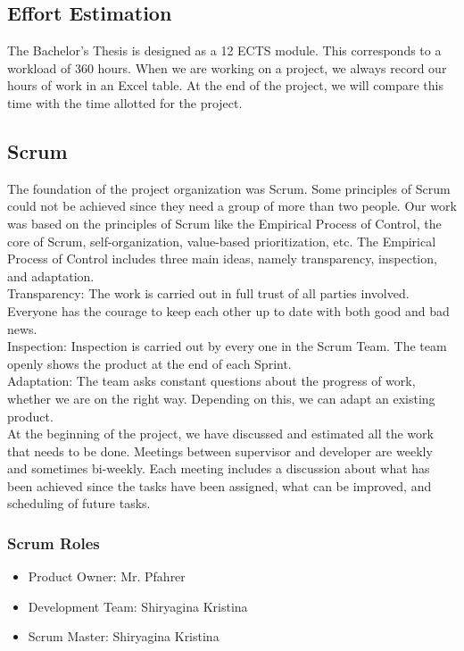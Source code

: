 \documentclass{scrartcl}
\begin{document}
\subsection{Effort Estimation}
  		
The Bachelor's Thesis  is designed as a 12 ECTS module. This corresponds to a workload of 360 hours. When we are working on a project, we always record our hours of work in an Excel table.
 At the end of the project, we will compare this time with the time allotted for the project. 		
  		
  		
  		
  		
  		
\subsection{Scrum}  	
The foundation of the project organization was Scrum.
 	    Some principles of Scrum could not be achieved since they need a group of more than two people. 
 	    Our work was based on the principles of Scrum like the Empirical Process of Control, the core of Scrum, self-organization, value-based prioritization, etc.
 	    The Empirical Process of Control includes three main ideas, namely transparency, inspection, and adaptation. \\
 	    Transparency: The work is carried out in full trust of all parties involved. Everyone has the courage to keep each other up to date with both good and bad news. \\ 
 	    Inspection: Inspection is carried out by every one in the Scrum Team. The team openly shows the product at the end of each Sprint.			 \\
 	    Adaptation: The team asks constant questions about the progress of work, whether we are on the right way. Depending on this, we can adapt an existing product.		 \\
 	    
 	    At the beginning of the project, we have discussed and estimated all the work that needs to be done. 
 	    Meetings between supervisor and developer are weekly and sometimes bi-weekly.
 	    Each meeting includes a discussion about what has been achieved 
 	    since the tasks have been assigned, what can be improved, and scheduling of future tasks.
 	    
 	    
 	    
 	    
 	    
 \subsubsection{Scrum Roles}
 \begin{itemize}
 \item Product Owner: Mr. Pfahrer
 \item Development Team: Shiryagina Kristina
 \item Scrum Master: Shiryagina Kristina
  		
  		\end{itemize}
\end{document}
